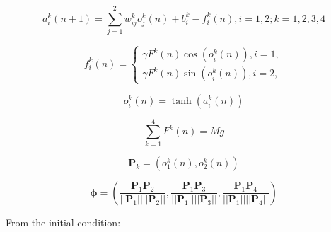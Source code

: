 \documentclass{article}
\renewcommand{\vec}[1]{\mathbf{#1}}
\begin{document}
\begin{equation}
    a_{i}^k(n+1)=\sum_{j=1}^{2} w_{ij}^{k}o_{j}^{k}(n)+b_{i}^{k}-f_{i}^{k}(n), i=1,2; k=1,2,3,4
    \label{equ:1}
\end{equation}



\begin{equation}
    f_{i}^{k}(n)=\left\{
        \begin{array}{rcl}
            \gamma F^{k}(n) \cos(o_{i}^{k}(n)), i=1,\\
            \gamma F^{k}(n) \sin(o_{i}^{k}(n)), i=2,
        \end{array}
    \right.
    \label{equ:2}
\end{equation}



\begin{equation}
    o_{i}^{k}(n) = \tanh(a_{i}^{k}(n))
    \label{equ:3}
\end{equation}

\begin{equation}
    \sum_{k=1}^{4} F^{k}(n)=Mg
    \label{equ:4}
\end{equation}



\begin{equation}
    \vec{P}_{k}=(o_{1}^{k}(n),o_{2}^{k}(n))
    \label{<+label+>}
\end{equation}





\begin{equation}
    \vec{\vec{\phi}}= (\frac{\vec{P}_{1} \vec{P}_{2}}{||\vec{P}_{1}|| ||\vec{P}_{2}||}, \frac{\vec{P}_{1} \vec{P}_{3}}{||\vec{P}_{1}|| ||\vec{P}_{3}||}, \frac{\vec{P}_{1} \vec{P}_{4}}{||\vec{P}_{1}|| ||\vec{P}_{4}||})
    \label{<+label+>}
\end{equation}



From the initial condition:
\end{document}
